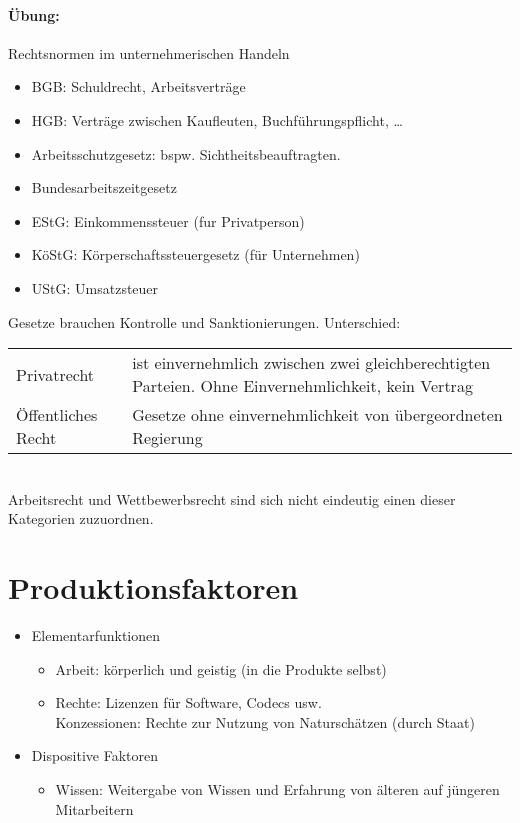 \paragraph{Übung:} Rechtsnormen im unternehmerischen Handeln
\begin{itemize}
\item BGB: Schuldrecht, Arbeitsverträge
\item HGB: Verträge zwischen Kaufleuten, Buchführungspflicht, …
\item Arbeitsschutzgesetz: bspw. Sichtheitsbeauftragten.
\item Bundesarbeitszeitgesetz
\item EStG: Einkommenssteuer (fur Privatperson)
\item KöStG: Körperschaftssteuergesetz (für Unternehmen)
\item UStG: Umsatzsteuer
\end{itemize}
Gesetze brauchen Kontrolle und Sanktionierungen.
Unterschied:\\
\begin{tabular}{p{} p{}}
Privatrecht & ist einvernehmlich zwischen zwei gleichberechtigten Parteien. Ohne Einvernehmlichkeit, kein Vertrag\\
Öffentliches Recht & Gesetze ohne einvernehmlichkeit von übergeordneten Regierung
\end{tabular}\\
Arbeitsrecht und Wettbewerbsrecht sind sich nicht eindeutig einen dieser Kategorien zuzuordnen.

\section{Produktionsfaktoren}
\begin{itemize}
\item Elementarfunktionen
\begin{itemize}
\item Arbeit: körperlich und geistig (in die Produkte selbst)
\item Rechte: Lizenzen für Software, Codecs usw.\\
Konzessionen: Rechte zur Nutzung von Naturschätzen (durch Staat)
\end{itemize}
\item Dispositive Faktoren
\begin{itemize}
\item Wissen: Weitergabe von Wissen und Erfahrung von älteren auf jüngeren Mitarbeitern
\end{itemize}
\end{itemize}
